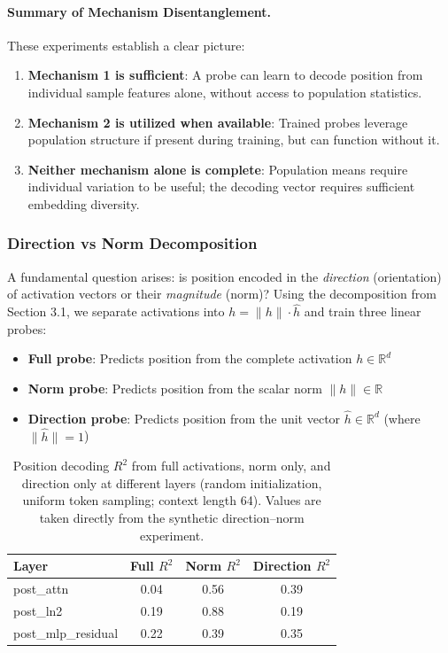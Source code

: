 \documentclass[11pt]{article}
\begin{document}
\paragraph{Summary of Mechanism Disentanglement.}
These experiments establish a clear picture:
\begin{enumerate}
    \item \textbf{Mechanism 1 is sufficient}: A probe can learn to decode position from individual sample features alone, without access to population statistics.
    \item \textbf{Mechanism 2 is utilized when available}: Trained probes leverage population structure if present during training, but can function without it.
    \item \textbf{Neither mechanism alone is complete}: Population means require individual variation to be useful; the decoding vector requires sufficient embedding diversity.
\end{enumerate}

\subsubsection{Direction vs Norm Decomposition}

A fundamental question arises: is position encoded in the \textit{direction} (orientation) of activation vectors or their \textit{magnitude} (norm)? Using the decomposition from Section 3.1, we separate activations into $h = \|h\| \cdot \hat{h}$ and train three linear probes:
\begin{itemize}
    \item \textbf{Full probe}: Predicts position from the complete activation $h \in \mathbb{R}^d$
    \item \textbf{Norm probe}: Predicts position from the scalar norm $\|h\| \in \mathbb{R}$
    \item \textbf{Direction probe}: Predicts position from the unit vector $\hat{h} \in \mathbb{R}^d$ (where $\|\hat{h}\|=1$)
\end{itemize}

\begin{table}[h]
\centering
\small
\begin{tabular}{lccc}
\toprule
\textbf{Layer} & \textbf{Full $R^2$} & \textbf{Norm $R^2$} & \textbf{Direction $R^2$} \\
\midrule
post\_attn & 0.04 & 0.56 & 0.39 \\
post\_ln2 & 0.19 & 0.88 & 0.19 \\
post\_mlp\_residual & 0.22 & 0.39 & 0.35 \\
\bottomrule
\end{tabular}
\caption{Position decoding $R^2$ from full activations, norm only, and direction only at different layers (random initialization, uniform token sampling; context length 64). Values are taken directly from the synthetic direction--norm experiment.}
\label{tab:direction-norm}
\end{table}
\end{document}
